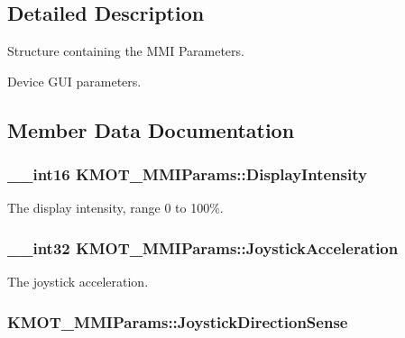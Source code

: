 \subsection{Detailed Description}
Structure containing the M\+MI Parameters. 

Device G\+UI parameters. 

\subsection{Member Data Documentation}
\subsubsection[{\texorpdfstring{Display\+Intensity}{DisplayIntensity}}]{\setlength{\rightskip}{0pt plus 5cm}\+\_\+\+\_\+int16 K\+M\+O\+T\+\_\+\+M\+M\+I\+Params\+::\+Display\+Intensity}\hypertarget{struct_k_m_o_t___m_m_i_params_a10d63cd6b82f786f9d39299d4a2d05b5}{}\label{struct_k_m_o_t___m_m_i_params_a10d63cd6b82f786f9d39299d4a2d05b5}


The display intensity, range 0 to 100\%. 

\subsubsection[{\texorpdfstring{Joystick\+Acceleration}{JoystickAcceleration}}]{\setlength{\rightskip}{0pt plus 5cm}\+\_\+\+\_\+int32 K\+M\+O\+T\+\_\+\+M\+M\+I\+Params\+::\+Joystick\+Acceleration}\hypertarget{struct_k_m_o_t___m_m_i_params_aab84bd5687ec88da360d2d369773a943}{}\label{struct_k_m_o_t___m_m_i_params_aab84bd5687ec88da360d2d369773a943}


The joystick acceleration. 

\subsubsection[{\texorpdfstring{Joystick\+Direction\+Sense}{JoystickDirectionSense}}]{ K\+M\+O\+T\+\_\+\+M\+M\+I\+Params\+::\+Joystick\+Direction\+Sense}\hypertarget{struct_k_m_o_t___m_m_i_params_a9884f6701df92383e17a8c5795f49762}{}\label{struct_k_m_o_t___m_m_i_params_a9884f6701df92383e17a8c5795f49762}


